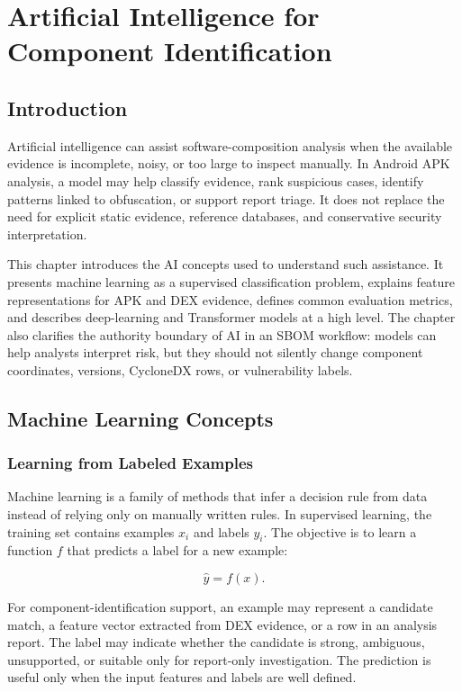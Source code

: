 \chapter{Artificial Intelligence for Component Identification}
\label{ch:pfe-ai}

\section{Introduction}

Artificial intelligence can assist software-composition analysis when the
available evidence is incomplete, noisy, or too large to inspect manually. In
Android APK analysis, a model may help classify evidence, rank suspicious
cases, identify patterns linked to obfuscation, or support report triage. It
does not replace the need for explicit static evidence, reference databases,
and conservative security interpretation.

This chapter introduces the AI concepts used to understand such assistance.
It presents machine learning as a supervised classification problem, explains
feature representations for APK and DEX evidence, defines common evaluation
metrics, and describes deep-learning and Transformer models at a high level.
The chapter also clarifies the authority boundary of AI in an SBOM workflow:
models can help analysts interpret risk, but they should not silently change
component coordinates, versions, CycloneDX rows, or vulnerability labels.

\section{Machine Learning Concepts}

\subsection{Learning from Labeled Examples}

Machine learning is a family of methods that infer a decision rule from data
instead of relying only on manually written rules. In supervised learning, the
training set contains examples \(x_i\) and labels \(y_i\). The objective is to
learn a function \(f\) that predicts a label for a new example:

\begin{equation}
\label{eq:pfe-ai-supervised-learning}
\hat{y}=f(x).
\end{equation}

For component-identification support, an example may represent a candidate
match, a feature vector extracted from DEX evidence, or a row in an analysis
report. The label may indicate whether the candidate is strong, ambiguous,
unsupported, or suitable only for report-only investigation. The prediction is
useful only when the input features and labels are well defined.

